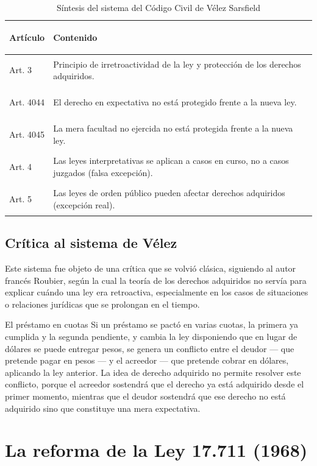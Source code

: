 \documentclass[12pt,oneside]{book}
\begin{document}
\begin{table}[H]
\centering
\begin{tabularx}{\textwidth}{>{\bfseries\raggedright\arraybackslash}p{} X}
\toprule
\textbf{Artículo} & \textbf{Contenido} \\
\midrule
Art. 3 & Principio de irretroactividad de la ley y protección de los derechos adquiridos. \\
Art. 4044 & El derecho en expectativa no está protegido frente a la nueva ley. \\
Art. 4045 & La mera facultad no ejercida no está protegida frente a la nueva ley. \\
Art. 4 & Las leyes interpretativas se aplican a casos en curso, no a casos juzgados (falsa excepción). \\
Art. 5 & Las leyes de orden público pueden afectar derechos adquiridos (excepción real). \\
\bottomrule
\end{tabularx}
\caption{Síntesis del sistema del Código Civil de Vélez Sarsfield}
\end{table}

\subsection{Crítica al sistema de Vélez}

Este sistema fue objeto de una crítica que se volvió clásica, siguiendo al autor francés Roubier, según la cual la teoría de los derechos adquiridos no servía para explicar cuándo una ley era retroactiva, especialmente en los casos de situaciones o relaciones jurídicas que se prolongan en el tiempo.

\begin{example}{El préstamo en cuotas}
Si un préstamo se pactó en varias cuotas, la primera ya cumplida y la segunda pendiente, y cambia la ley disponiendo que en lugar de dólares se puede entregar pesos, se genera un conflicto entre el deudor --- que pretende pagar en pesos --- y el acreedor --- que pretende cobrar en dólares, aplicando la ley anterior. La idea de derecho adquirido no permite resolver este conflicto, porque el acreedor sostendrá que el derecho ya está adquirido desde el primer momento, mientras que el deudor sostendrá que ese derecho no está adquirido sino que constituye una mera expectativa.
\end{example}

\section{La reforma de la Ley 17.711 (1968)}
\end{document}
